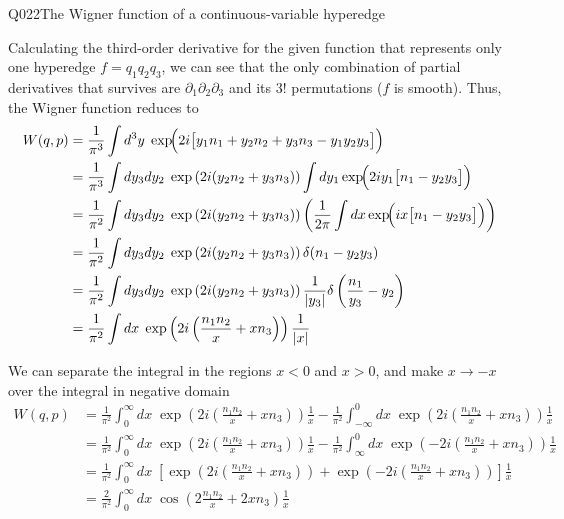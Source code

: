 \begin{entry}{Q022}{The Wigner function of a continuous-variable hyperedge}
\begin{solution}[Part (c)]
Calculating the third-order derivative for the given function that represents only one hyperedge $f=q_1q_2q_3$, we can see that the only combination of partial derivatives that survives are
$\partial_1\partial_2\partial_3$ and its $3!$ permutations ($f$ is smooth).
Thus, the Wigner function reduces to
\begin{equation}
\begin{split}
   W(q,p)&=\frac{1}{\pi^{3}}\int d^{3}y\;
          \exp\!\Bigl(2i\bigl[ y_1n_1 + y_2n_2 + y_3n_3-  y_1y_2y_3 \bigr]\Bigr)\\
          &= \frac{1}{\pi^{3}}\int dy_3dy_2\;\exp\left(2i(y_2n_2+y_3n_3)\right)
          \int dy_1\exp\!\Bigl(2i y_1\bigl[  n_1-  y_2y_3 \bigr]\Bigr)\\
          &= \frac{1}{\pi^{2}}\int dy_3dy_2\;\exp\left(2i(y_2n_2+y_3n_3)\right)
          \left(\frac{1}{2\pi}\int dx\exp\!\Bigl(i x\bigl[  n_1-  y_2y_3 \bigr]\Bigr)\right)\\
          &= \frac{1}{\pi^{2}}\int dy_3dy_2\;\exp\left(2i(y_2n_2+y_3n_3)\right)
          \delta(n_1-y_2y_3)\\
          &= \frac{1}{\pi^{2}}\int dy_3dy_2\;\exp\left(2i(y_2n_2+y_3n_3)\right)
          \frac{1}{|y_3|}\delta\left(\frac{n_1}{y_3}-y_2\right)\\
          &= \frac{1}{\pi^{2}}\int dx\;\exp\left(2i\left(\frac{n_1n_2}{x}+xn_3\right)\right)
          \frac{1}{|x|}
\end{split}
\label{q022:reduction}
\end{equation}

We can separate the integral in the regions $x<0$ and $x>0$, and make $x\rightarrow -x$ over the integral in negative domain
\begin{equation}
\begin{split}
   W(q,p)&= \frac{1}{\pi^{2}}\int^{\infty}_0 dx\;\exp\left(2i\left(\frac{n_1n_2}{x}+xn_3\right)\right)
          \frac{1}{x} - \frac{1}{\pi^{2}}\int_{-\infty}^0 dx\;\exp\left(2i\left(\frac{n_1n_2}{x}+xn_3\right)\right)
          \frac{1}{x}\\
          &= \frac{1}{\pi^{2}}\int^{\infty}_0 dx\;\exp\left(2i\left(\frac{n_1n_2}{x}+xn_3\right)\right)
          \frac{1}{x} -\frac{1}{\pi^{2}}\int_{\infty}^0 dx\;\exp\left(-2i\left(\frac{n_1n_2}{x}+xn_3\right)\right)
          \frac{1}{x}\\
          &= \frac{1}{\pi^{2}}\int_{0}^{\infty} dx\;\left[\exp\left(2i\left(\frac{n_1n_2}{x}+xn_3\right)\right) + \exp\left(-2i\left(\frac{n_1n_2}{x}+xn_3\right)\right) \right] \frac{1}{x}\\
          &= \frac{2}{\pi^{2}}\int_{0}^{\infty}
          dx\;\cos\left(2\frac{n_1n_2}{x}+2xn_3 \right)  \frac{1}{x}
\end{split}
\label{q022:cosine-form}
\end{equation}


\end{solution}
\end{entry}
